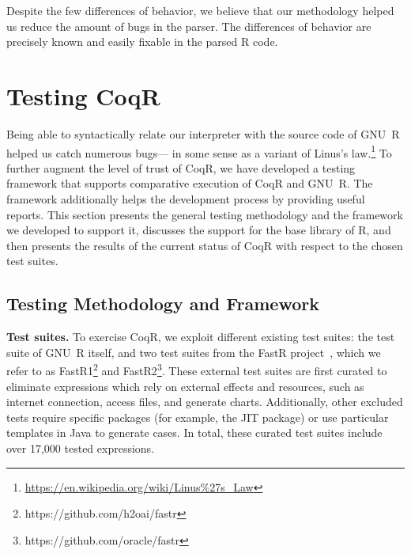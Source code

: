 \documentclass[
    sigplan,
    10pt,
    review, %
    natbib=false %
 ]{acmart}
\newcommand\mb[1]{\todo[color=purple!20,size=\scriptsize]{#1}}
\newcommand\et[1]{\todo[color=blue!20,size=\scriptsize]{#1}}
\newcommand\CoqR{CoqR}
\begin{document}
Despite the few differences of behavior,
we believe that our methodology helped us
reduce the amount of bugs in the parser.
The differences of behavior are precisely known
and easily fixable in the parsed R code.
%
%


\section{Testing \CoqR}
\label{sec:testing:architecture}


Being able to syntactically relate our interpreter
with the source code of GNU~R helped us catch numerous bugs---%
in some sense as a variant of Linus's law.\footnote{\url{https://en.wikipedia.org/wiki/Linus\%27s\_Law}}
To further augment the level of trust of \CoqR{}, we have developed
a testing framework that supports comparative execution of \CoqR{} and GNU~R. The framework additionally helps the development process by providing useful reports. This section presents the general testing methodology and the framework we developed to support it, discusses the support for the base library of R, and then presents the results of the current status of \CoqR{} with respect to the chosen test suites.





\subsection{Testing Methodology and Framework}
\label{sec:test:methodology}

\noindent\textbf{Test suites.}
To exercise \CoqR, we exploit different existing test suites:
the test suite of GNU~R itself, and two test suites from the FastR project~\parencite{kalibera2014fast}, which we refer to as FastR1\footnote{https://github.com/h2oai/fastr} and FastR2\footnote{https://github.com/oracle/fastr}. These external test suites are first curated to eliminate expressions which rely on external effects and resources, such as internet connection, access files, and generate charts.
 Additionally, other excluded tests require specific packages (for example, the JIT package) or use particular templates in Java to generate cases. In total, these curated test suites include over 17,000 tested expressions.
\end{document}
